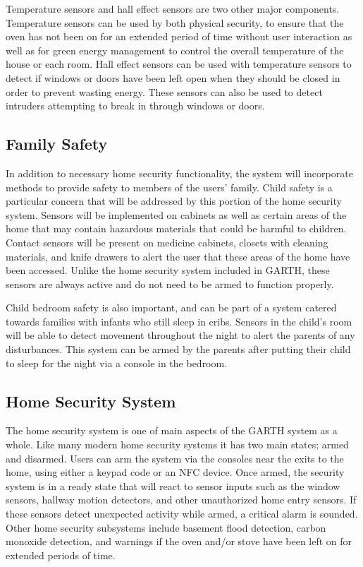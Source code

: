 \documentclass{report}
\begin{document}
Temperature sensors and hall effect sensors are two other major components.
Temperature sensors can be used by both physical security, to ensure that the
oven has not been on for an extended period of time without user interaction as
well as for green energy management to control the overall temperature of the
house or each room. Hall effect sensors can be used with temperature sensors to
detect if windows or doors have been left open when they should be closed in
order to prevent wasting energy. These sensors can also be used to detect
intruders attempting to break in through windows or doors.

\subsection{Family Safety}

In addition to necessary home security functionality, the system will
incorporate methods to provide safety to members of the users' family. Child
safety is a particular concern that will be addressed by this portion of the
home security system. Sensors will be implemented on cabinets as well as
certain areas of the home that may contain hazardous materials that could be
harmful to children. Contact sensors will be present on medicine cabinets,
closets with cleaning materials, and knife drawers to alert the user that these
areas of the home have been accessed. Unlike the home security system
included in GARTH, these sensors are always active and do not need to be
armed to function properly. 

Child bedroom safety is also important, and can be part of a system catered 
towards families with infants who still sleep in cribs. Sensors in the child's room 
will be able to detect movement throughout the night to alert the parents of any 
disturbances. This system can be armed by the parents after putting their child
to sleep for the night via a console in the bedroom.

\subsection{Home Security System}

The home security system is one of main aspects of the GARTH system as a
whole. Like many modern home security systems it has two main states; armed
and disarmed. Users can arm the system via the consoles near the exits to the
home, using either a keypad code or an NFC device. Once armed, the security
system is in a ready state that will react to sensor inputs such as the window
sensors, hallway motion detectors, and other unauthorized home entry sensors.
If these sensors detect unexpected activity while armed, a critical alarm is sounded.
Other home security subsystems include basement flood detection, carbon 
monoxide detection, and warnings if the oven and/or stove have been left on
for extended periods of time.
\end{document}
